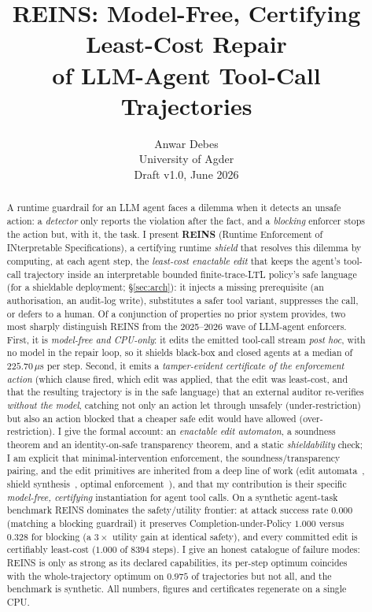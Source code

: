\documentclass[11pt]{article}
\title{\textbf{REINS: Model-Free, Certifying Least-Cost Repair\\
of LLM-Agent Tool-Call Trajectories}}
\author{Anwar Debes\\
University of Agder\\
\vspace{0.4em}\small Draft v1.0, June 2026}
\date{}
\newcommand{\cupReins}{1.000}\newcommand{\cupReinsSd}{0.000}
\newcommand{\cupBlock}{0.328}\newcommand{\cupBlockSd}{0.078}
\newcommand{\asrReins}{0.000}\newcommand{\asrBlock}{0.000}\newcommand{\asrNoshield}{1.000}
\newcommand{\certMinRate}{1.000}\newcommand{\stepsChecked}{8394}
\newcommand{\globalAgree}{0.975}\newcommand{\globalTraj}{480}\newcommand{\globalGap}{15.0}
\newcommand{\shieldMed}{225.70}\newcommand{\shieldPnn}{793.10}
\begin{document}
\maketitle

\begin{abstract}
A runtime guardrail for an LLM agent faces a dilemma when it detects an unsafe
action: a \emph{detector} only reports the violation after the fact, and a
\emph{blocking} enforcer stops the action but, with it, the task. I present
\textbf{REINS} (Runtime Enforcement of INterpretable Specifications), a
certifying runtime \emph{shield} that resolves this dilemma by computing, at each
agent step, the \emph{least-cost enactable edit} that keeps the agent's tool-call
trajectory inside an interpretable bounded finite-trace-LTL policy's safe language
(for a shieldable deployment; \S\ref{sec:arch}): it injects a missing prerequisite
(an authorisation, an audit-log write), substitutes a safer tool variant, suppresses
the call, or defers to a human. Of a conjunction of properties no prior
system provides, two most sharply distinguish REINS from the 2025--2026 wave of
LLM-agent enforcers. First, it is \emph{model-free and CPU-only}: it edits the emitted tool-call
stream \emph{post hoc}, with no model in the repair loop, so it shields black-box
and closed agents at a median of $\shieldMed\,\mu$s per step. Second, it emits a
\emph{tamper-evident certificate of the enforcement action} (which clause
fired, which edit was applied, that the edit was least-cost, and that the
resulting trajectory is in the safe language) that an external auditor
re-verifies \emph{without the model}, catching not only an action let through
unsafely (under-restriction) but also an action blocked that a cheaper safe edit
would have allowed (over-restriction). I give the formal account: an
\emph{enactable edit automaton}, a soundness theorem and an identity-on-safe
transparency theorem, and a static \emph{shieldability} check; I am explicit
that minimal-intervention enforcement, the soundness/transparency pairing, and
the edit primitives are inherited from a deep line of work (edit
automata~\citep{ligatti2005edit}, shield
synthesis~\citep{bloem2015shield,alshiekh2018safe}, optimal
enforcement~\citep{pandya2019optimal,gallay2021decentralized}), and that my
contribution is their specific \emph{model-free, certifying} instantiation for
agent tool calls. On a synthetic agent-task benchmark REINS dominates the
safety/utility frontier: at attack success rate $\asrReins$ (matching a blocking
guardrail) it preserves Completion-under-Policy $\cupReins$ versus $\cupBlock$ for
blocking (a $3\times$ utility gain at identical safety), and every committed
edit is certifiably least-cost ($\certMinRate$ of $\stepsChecked$ steps). I give
an honest catalogue of failure modes: REINS is only as strong as its declared
capabilities, its per-step optimum coincides with the whole-trajectory optimum on
$\globalAgree$ of trajectories but not all, and the benchmark is synthetic. All
numbers, figures and certificates regenerate on a single CPU.
\end{abstract}
\end{document}

